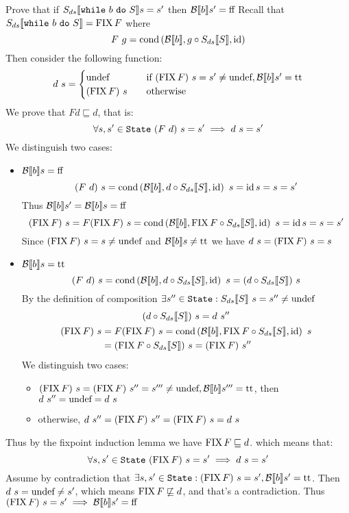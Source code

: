 \begin{exercise}{
    Prove that if $\Sds{\wwhile{b}{S}} s = s'$ then $\Bool{b} s' = \False$
}
    Recall that $\Sds{\wwhile{b}{S}} = \FIX F$ where 
    \[ F\ g= \cond{\Bool{b}}{g \circ \Sds{S}}{\id} \]
    Then consider the following function:
    \[
        d\ s = \begin{cases}
            \undef &\quad \text{if } (\FIX F)\ s = s' \neq \undef, \Bool{b} s' = \True \\
            (\FIX F)\ s &\quad \text{otherwise}
        \end{cases}
    \]
    We prove that $F d \sqsubseteq d$, that is:
    \[ \forall s, s' \in \State\ (F\ d)\ s = s' \implies d\ s = s' \]
    We distinguish two cases:
    \begin{itemize}
        \item $\Bool{b} s = \False$
            \[ (F\ d)\ s = \cond{\Bool{b}}{d \circ \Sds{S}}{\id}\ s = \id s = s = s' \]
            Thus $\Bool{b} s' = \Bool{b} s = \False$
            \[ (\FIX F)\ s = F(\FIX F)\ s = \cond{\Bool{b}}{\FIX F \circ \Sds{S}}{\id}\ s = \id s = s = s' \]
            Since $(\FIX F)\ s = s \neq \undef$ and $\Bool{b} s \neq \True$ we have $d\ s = (\FIX F)\ s = s$
        \item $\Bool{b} s = \True$
            \[ (F\ d)\ s = \cond{\Bool{b}}{d \circ \Sds{S}}{\id}\ s = (d \circ \Sds{S})\ s \]
            By the definition of composition $\exists s'' \in \State : \Sds{S}\ s = s'' \neq \undef$
            \begin{gather*}
                (d \circ \Sds{S})\ s = d\ s'' \\
                \begin{aligned}
                    (\FIX F)\ s &= F(\FIX F)\ s = \cond{\Bool{b}}{\FIX F \circ \Sds{S}}{\id}\ s \\
                    &= (\FIX F \circ \Sds{S})\ s = (\FIX F)\ s''
                \end{aligned}
            \end{gather*}
            We distinguish two cases:
            \begin{itemize}
                \item $(\FIX F)\ s = (\FIX F)\ s'' = s''' \neq \undef, \Bool{b} s''' = \True$, then $d\ s'' = \undef = d\ s$
                \item otherwise, $d\ s'' = (\FIX F)\ s'' = (\FIX F)\ s = d\ s$
            \end{itemize}
    \end{itemize}
    Thus by the fixpoint induction lemma we have $\FIX F \sqsubseteq d$. which means that:
    \[ \forall s, s' \in \State\ (\FIX F)\ s = s' \implies d\ s = s' \]
    Assume by contradiction that $\exists s, s' \in \State : (\FIX F)\ s = s', \Bool{b} s' = \True $. Then $d\ s = \undef \neq s'$, which means $\FIX F \not\sqsubseteq d$, and that's a contradiction. Thus $(\FIX F)\ s = s' \implies \Bool{b} s' = \False$
\end{exercise}
